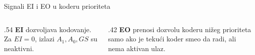 \begin{frame}[label=03-s020]{Signali EI i EO u koderu prioriteta}
\begin{columns}[T,onlytextwidth]
\begin{column}{.54\textwidth}
\textcolor{DEisticanje}{\textbf{EI}} dozvoljava kodovanje. Za \(EI=0\), izlazi \(A_1,A_0,GS\) su neaktivni.
\par\vspace{1mm}
\begin{center}\begingroup{}\def\DEjedinica{.60cm}\endgroup\end{center}
\end{column}
\begin{column}{.42\textwidth}
\textcolor{DEisticanje}{\textbf{EO}} prenosi dozvolu koderu nižeg prioriteta samo ako je tekući koder smeo da radi, ali nema aktivan ulaz.
\par\vspace{3mm}
\end{column}
\end{columns}
\end{frame}
